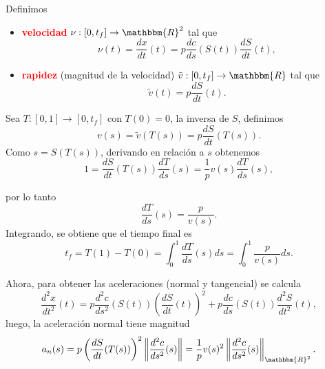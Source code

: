 \documentclass[10pt,mathserif]{beamer}
\newcommand{\R}{\mathbbm{R}}
\newcommand{\arr}{\rightarrow}
\begin{document}
\begin{frame}

Definimos
  \begin{itemize}
      \item \textcolor{red}{\textbf{velocidad}} $\nu:[0,t_f]\arr\R^2$ tal que
      \textcolor{myorange}{\begin{equation*}
  \nu(t)=\frac{dx}{dt}(t)=p\frac{dc}{ds}(S(t))\frac{dS}{dt}(t), \label{velocidad}
\end{equation*}}
    \item \textcolor{red}{\textbf{rapidez}} (magnitud de la velocidad) $\tilde{v}:[0,t_f]\arr\R$ tal que
\textcolor{myorange}{\[
 \tilde{v}(t)=p\frac{dS}{dt}(t).
\]}
  \end{itemize}
   


Sea $T:[0,1]\arr [0,t_f]$ con $T(0)=0$, la inversa de $S$, definimos
\textcolor{myorange}{\begin{equation*}\label{v}
v(s)=\tilde v(T(s))=p\frac{dS}{dt}(T(s)). 
\end{equation*}}
Como $s=S(T(s))$, derivando en relaci\'on a $s$ obtenemos 
\textcolor{mybrown}{\begin{equation*}\label{auxdSdt}
1=\frac{dS}{dt}(T(s)) \frac{dT}{ds}(s)= \frac{1}{p} v(s)\frac{dT}{ds}(s), 
\end{equation*}}
\end{frame}
\begin{frame}
  por lo tanto
\textcolor{mybrown}{\[
 \frac{dT}{ds}(s)=\frac{p}{v(s)}.
\]}
Integrando, se obtiene que el tiempo final es
\textcolor{myorange}{\begin{equation*}\label{tiempo}
t_f=T(1)-T(0)=\int_{0}^{1} \frac{dT}{ds}(s) ds= \int_{0}^{1} \frac{p}{v(s)}ds.    
\end{equation*}}

\pause
Ahora, para obtener las aceleraciones (normal y tangencial) se calcula
\textcolor{mybrown}{\begin{equation*}\label{aceleracion}
\frac{d^2 x}{dt^2}(t)= p\frac{d^2 c}{ds^2}(S(t)) \left(\frac{dS}{dt}(t)\right)^2 + p\frac{dc}{ds}(S(t))\frac{d^2 S}{dt^2}(t),
\end{equation*}}
luego, la aceleración normal tiene magnitud
\textcolor{myorange}{\begin{equation*}\label{acelnormal}
a_n(s)=p\left(\frac{dS}{dt}(T(s))\right)^2\left\| \frac{d^2 c}{ds^2}(s) \right\|=\frac{1}{p} v(s)^2\left\| \frac{d^2 c}{ds^2}(s) \right\|_{\R^2}.
\end{equation*}}


\end{frame}
\end{document}
